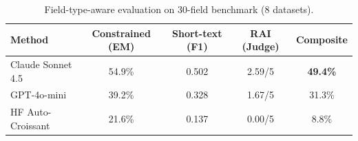 \begin{table}[h]
\centering
\caption{Field-type-aware evaluation on 30-field benchmark (8 datasets).}
\begin{tabular}{lcccc}
\toprule
Method & Constrained (EM) & Short-text (F1) & RAI (Judge) & Composite \\
\midrule
Claude Sonnet 4.5 & 54.9\% & 0.502 & 2.59/5 & \textbf{49.4\%} \\
GPT-4o-mini & 39.2\% & 0.328 & 1.67/5 & 31.3\% \\
HF Auto-Croissant & 21.6\% & 0.137 & 0.00/5 & 8.8\% \\
\bottomrule
\end{tabular}
\end{table}